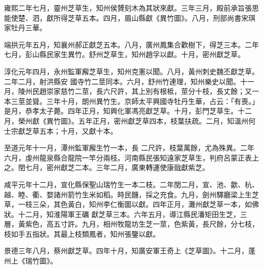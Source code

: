 \begin{pinyinscope}
 雍熙二年七月，靈州芝草生，知州侯贇刻木為其狀來獻。三年三月，殿前承旨張思能使楚、泗，獻所得芝草五本。四月，眉山縣獻《異竹圖》。八月，刑部尚書宋琪家牡丹三華。



 端拱元年五月，知襄州郝正獻芝五本。八月，廣州鳳集合歡樹下，得芝三本。二年七月，彭山縣民家生異竹。舒州芝草生，知州趙孚以獻。十月，密州獻芝草。



 淳化元年四月，永州監軍廨芝草生，知州克憲以聞。八月，黃州刺史魏丕獻芝草。二年二月，射洪縣安
 國寺竹二莖同本。六月，舒州竹連理，知州樂史以聞。十一月，陵州民趙崇家慈竹二莖，長六尺許，其上別有根柢，莖分十枝，長丈餘；又一本三莖並聳。三年十月，朗州異竹生。京師太平興國寺牡丹生華，占云：「有喪。」是月，恭孝太子薨。四年正月，知興化軍馮亮獻芝草。十月，彭門芝草生。十二月，榮州獻《異竹圖》。五年正月，密州獻芝草四本，枝葉扶疏。二月，知溫州何士宗獻芝草五本；十月，又獻十本。



 至道元年十一月，潭州監軍廨生竹一本，長
 二尺許，枝葉萬餘，尤為殊異。二年六月，虔州龍泉縣合龍院一竿分兩枝。河南縣民張知遠家芝草生，判府呂蒙正表上之。閏七月，密州獻芝二本。三年二月，廣東轉運使康戩獻紫芝。



 咸平元年十二月，宣化縣保聖山瑞竹生一本二枝。二年閏二月，宣、池、歙、杭、越、睦、衢、婺諸州箭竹生米如稻。時民饑，採之充食。九月，劍州驛廳梁上生芝草，一枝三朵，其色黃白，知州李仁衡圖以獻。四年正月，灘州獻芝草一本，如佛狀。十二月，知淮陽軍王礪
 獻芝草三本。六年五月，導江縣民潘矩田生芝，三層，黃紫色，高五寸許。九月，相州牧龍坊生芝一莖，色紫黃，長尺餘，分七枝，枝如手五指狀。其最上枝類鳳者，知州張鑒以獻。



 景德三年八月，蔡州獻芝草。四年十月，知廣安軍王奇上《芝草圖》。十二月，蓬州上《瑞竹圖》。




\end{pinyinscope}
